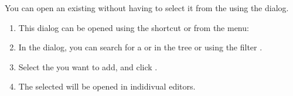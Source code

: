 You can open an existing \gdcase{} without having to select it from the \gdtestcasebrowser{} using the  dialog. 

\begin{enumerate}
\item  This dialog can be opened using the shortcut  or from the menu:\\
\item In the dialog, you can search for a \gdcase{} or \gdcases{} in the tree or using the filter . 
\item Select the \gdcases{} you want to add, and click .
\item The selected \gdcases{} will be opened in indidivual \gdcase{} editors. 
\end{enumerate}

